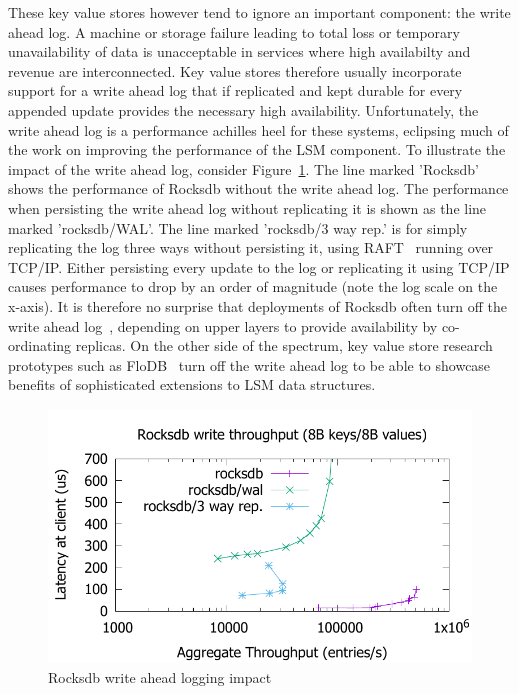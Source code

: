 \documentclass[pageno]{jpaper}
\begin{document}
These key value stores however tend to ignore an important component: the write
ahead log. A machine or storage failure leading to total loss or temporary
unavailability of data is unacceptable in services where high availabilty and
revenue are interconnected. Key value stores therefore usually incorporate
support for a write ahead log that if replicated and kept durable for every
appended update provides the necessary high availability. Unfortunately, the
write ahead log is a performance achilles heel for these systems, eclipsing much
of the work on improving the performance of the LSM component. To illustrate the
impact of the write ahead log, consider Figure~\ref{fig:problem}. The line
marked 'Rocksdb' shows the performance of Rocksdb without the write ahead
log. The performance when persisting the write ahead log without replicating it
is shown as the line marked 'rocksdb/WAL'. The line marked 'rocksdb/3 way rep.'
is for simply replicating the log three ways without persisting it, using
RAFT~\cite{raft} running over TCP/IP. Either persisting every update to the log
or replicating it using TCP/IP causes performance to drop by an order of
magnitude (note the log scale on the x-axis). It is therefore no surprise that
deployments of Rocksdb often turn off the write ahead log~\cite{samza},
depending on upper layers to provide availability by co-ordinating replicas. On
the other side of the spectrum, key value store research prototypes such as
FloDB~\cite{flodb} turn off the write ahead log to be able to showcase benefits
of sophisticated extensions to LSM data structures.


\begin{figure}
\centering \includegraphics[scale=0.6]{results2/problem.pdf}
\caption{Rocksdb write ahead logging impact}
\label{fig:problem}
\end{figure}
\end{document}
